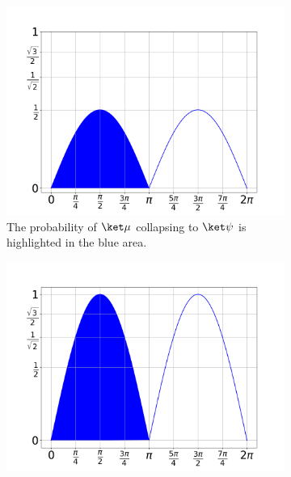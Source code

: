 \begin{figure}[htb]
    \centering
    \begin{subfigure}[t]{0.45\textwidth}
        \includegraphics[width=\textwidth]{img/noson/chapter04/section4_1/measure-psi-from-mu.png}
        \captionsetup{width=0.9\textwidth}
        \caption{The probability of $\ket \mu$ collapsing to $\ket \psi$ is
            highlighted in the blue area.}
        \label{fig:noson-equation-4-5-measurement-mu}
    \end{subfigure}
    \begin{subfigure}[t]{0.45\textwidth}
        \includegraphics[width=\textwidth]{img/noson/chapter04/section4_1/measure-psi-from-2-sqrt2-mu.png}
        \captionsetup{width=0.9\textwidth}

\end{subfigure}
\end{figure}
